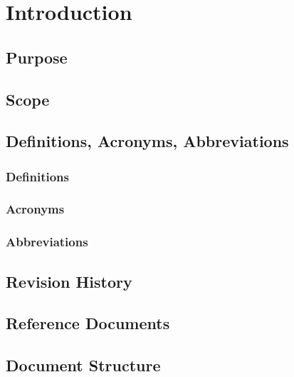 
\section{Introduction}

\subsection{Purpose}

\subsection{Scope}

    \subsection{Definitions, Acronyms, Abbreviations}
    \subsubsection{Definitions}
    \subsubsection{Acronyms}
    \subsubsection{Abbreviations}

\subsection{Revision History}

\subsection{Reference Documents}

\subsection{Document Structure}
